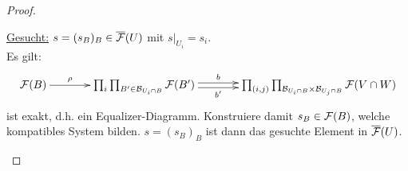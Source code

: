 \begin{proof}
\begin{itemize}
\begin{itemize}
    	\underline{Gesucht:} $s = (s_B)_{B} \in \overline{\mathcal{F}}(U)$ mit $s|_{U_{i}} = s_{i}$.\\
    	Es gilt:\\
    \[\xymatrixcolsep{3pc}\xymatrix{
     \sheaf{F}(B) \ar^-\rho@{->}[r] & \prod_{i} \prod_{B' \in \mathcal{B}_{U_{i} \cap B}} \sheaf{F}(B') \ar^-b@<+.5ex>[r] \ar_-{b'}@<-.5ex>[r] & \prod_{(i, j)} \prod_{\mathcal{B}_{U_{i} \cap B} \times \mathcal{B}_{U_{j} \cap B}} \sheaf{F}(V \cap W)
    }\] ist exakt, d.h. ein Equalizer-Diagramm. Konstruiere damit $s_{B} \in \mathcal{F}(B)$, welche kompatibles System bilden. $s = (s_B)_{B}$ ist dann das gesuchte Element in $\overline{\mathcal{F}}(U)$. 	
    \end{itemize}
\end{itemize}
\end{proof}

